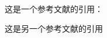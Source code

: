\documentclass{ctexart}%
\begin{document}
	
	这是一个参考文献的引用：\cite{triggs_bundle_2011}
	
	
	这是另一个参考文献的引用\textsuperscript{\cite{kelly_visual-inertial_2011}}
	
	\nocite{*}
	
	
\end{document}

